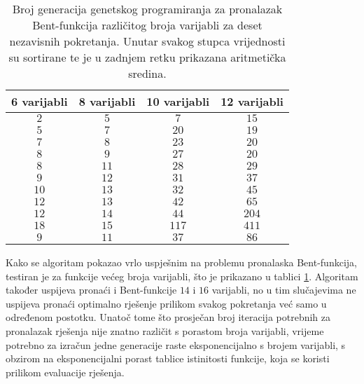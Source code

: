 \begin{table}[]
    \centering
    \captionsetup{justification=centering}
    \caption{Broj generacija genetskog programiranja za pronalazak Bent-funkcija različitog broja varijabli za deset nezavisnih pokretanja. Unutar svakog stupca vrijednosti su sortirane te je u zadnjem retku prikazana aritmetička sredina.}
    \begin{tabular}{cccc} \hline
        6 varijabli & 8 varijabli & 10 varijabli & 12 varijabli \\ \hline
         $2$ &  $5$ &   $7$ &  $15$ \\
         $5$ &  $7$ &  $20$ &  $19$ \\
         $7$ &  $8$ &  $23$ &  $20$ \\
         $8$ &  $9$ &  $27$ &  $20$ \\
         $8$ & $11$ &  $28$ &  $29$ \\
         $9$ & $12$ &  $31$ &  $37$ \\
        $10$ & $13$ &  $32$ &  $45$ \\
        $12$ & $13$ &  $42$ &  $65$ \\
        $12$ & $14$ &  $44$ & $204$ \\
        $18$ & $15$ & $117$ & $411$ \\ \hline
         $9$ & $11$ &  $37$ &  $86$
    \end{tabular}
    \label{tbl:gp_bent}
\end{table}
Kako se algoritam pokazao vrlo uspješnim na problemu pronalaska Bent-funkcija, testiran je za funkcije većeg broja varijabli, što je prikazano u tablici \ref{tbl:gp_bent}.
Algoritam također uspijeva pronaći i Bent-funkcije $14$ i $16$ varijabli, no u tim slučajevima ne uspijeva pronaći optimalno rješenje prilikom svakog pokretanja već samo u određenom postotku.
Unatoč tome što prosječan broj iteracija potrebnih za pronalazak rješenja nije znatno različit s porastom broja varijabli, vrijeme potrebno za izračun jedne generacije raste eksponencijalno s brojem varijabli, s obzirom na eksponencijalni porast tablice istinitosti funkcije, koja se koristi prilikom evaluacije rješenja.

